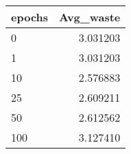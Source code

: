 \begin{tabular}{lr}
\toprule
epochs &  Avg\_waste \\
\midrule
     0 &   3.031203 \\
     1 &   3.031203 \\
    10 &   2.576883 \\
    25 &   2.609211 \\
    50 &   2.612562 \\
   100 &   3.127410 \\
\bottomrule
\end{tabular}
